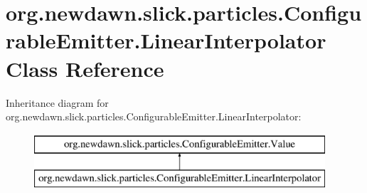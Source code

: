 \hypertarget{classorg_1_1newdawn_1_1slick_1_1particles_1_1_configurable_emitter_1_1_linear_interpolator}{}\section{org.\+newdawn.\+slick.\+particles.\+Configurable\+Emitter.\+Linear\+Interpolator Class Reference}
\label{classorg_1_1newdawn_1_1slick_1_1particles_1_1_configurable_emitter_1_1_linear_interpolator}
Inheritance diagram for org.\+newdawn.\+slick.\+particles.\+Configurable\+Emitter.\+Linear\+Interpolator\+:\begin{figure}[H]
\begin{center}
\leavevmode
\includegraphics[height=2.000000cm]{classorg_1_1newdawn_1_1slick_1_1particles_1_1_configurable_emitter_1_1_linear_interpolator}
\end{center}
\end{figure}
